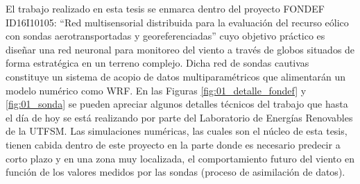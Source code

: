 El trabajo realizado en esta tesis se enmarca dentro del proyecto FONDEF ID16I10105: ``Red multisensorial distribuida para la evaluación del recurso eólico con sondas aerotransportadas y georeferenciadas'' cuyo objetivo práctico es diseñar una red neuronal para monitoreo del viento a través de globos situados de forma estratégica en un terreno complejo. Dicha red de sondas cautivas constituye un sistema de acopio de datos multiparamétricos que alimentarán un modelo numérico como WRF. En las Figuras \ref{fig:01_detalle_fondef} y \ref{fig:01_sonda} se pueden apreciar algunos detalles técnicos del trabajo que hasta el día de hoy se está realizando por parte del Laboratorio de Energías Renovables de la UTFSM. Las simulaciones numéricas, las cuales son el núcleo de esta tesis, tienen cabida dentro de este proyecto en la parte donde es necesario predecir a corto plazo y en una zona muy localizada, el comportamiento futuro del viento en función de los valores medidos por las sondas (proceso de asimilación de datos).

